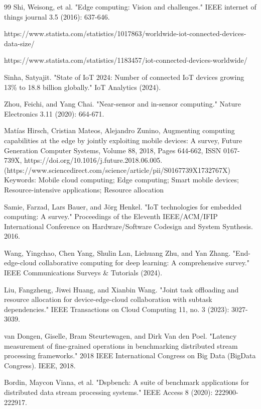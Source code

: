 \documentclass[runningheads]{llncs}
\begin{document}
\begin{thebibliography}{99}
%
Shi, Weisong, et al. "Edge computing: Vision and challenges." IEEE internet of things journal 3.5 (2016): 637-646.

%
https://www.statista.com/statistics/1017863/worldwide-iot-connected-devices-data-size/

%
https://www.statista.com/statistics/1183457/iot-connected-devices-worldwide/

%
Sinha, Satyajit. "State of IoT 2024: Number of connected IoT devices growing 13\% to 18.8 billion globally." IoT Analytics (2024).

%
Zhou, Feichi, and Yang Chai. "Near-sensor and in-sensor computing." Nature Electronics 3.11 (2020): 664-671.

%
Matías Hirsch, Cristian Mateos, Alejandro Zunino,
Augmenting computing capabilities at the edge by jointly exploiting mobile devices: A survey,
Future Generation Computer Systems,
Volume 88,
2018,
Pages 644-662,
ISSN 0167-739X,
https://doi.org/10.1016/j.future.2018.06.005.
(https://www.sciencedirect.com/science/article/pii/S0167739X1732767X)
Keywords: Mobile cloud computing; Edge computing; Smart mobile devices; Resource-intensive applications; Resource allocation

%
Samie, Farzad, Lars Bauer, and Jörg Henkel. "IoT technologies for embedded computing: A survey." Proceedings of the Eleventh IEEE/ACM/IFIP International Conference on Hardware/Software Codesign and System Synthesis. 2016.

%
Wang, Yingchao, Chen Yang, Shulin Lan, Liehuang Zhu, and Yan Zhang. "End-edge-cloud collaborative computing for deep learning: A comprehensive survey." IEEE Communications Surveys \& Tutorials (2024).

%
Liu, Fangzheng, Jiwei Huang, and Xianbin Wang. "Joint task offloading and resource allocation for device-edge-cloud collaboration with subtask dependencies." IEEE Transactions on Cloud Computing 11, no. 3 (2023): 3027-3039.

%
van Dongen, Giselle, Bram Steurtewagen, and Dirk Van den Poel. "Latency measurement of fine-grained operations in benchmarking distributed stream processing frameworks." 2018 IEEE International Congress on Big Data (BigData Congress). IEEE, 2018.

%
Bordin, Maycon Viana, et al. "Dspbench: A suite of benchmark applications for distributed data stream processing systems." IEEE Access 8 (2020): 222900-222917.


\end{thebibliography}
\end{document}
